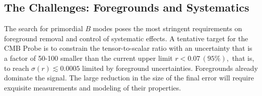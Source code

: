 

\subsection{The Challenges: Foregrounds and Systematics}
\label{sec:foregrounds_systematics}

\vspace{-0.05in}

The search for primordial $B$ modes poses the most stringent requirements on foreground removal 
and control of systematic effects. A tentative target for the CMB Probe is to constrain the tensor-to-scalar ratio with an 
uncertainty that is a factor of 50-100 smaller than the current upper limit $r < 0.07\, (95\%),$ that is, to reach 
$\sigma(r)\lesssim0.0005$ 
limited by foreground uncertainties. 
Foregrounds already dominate the signal. The large reduction in the size of 
the final error will require exquisite measurements and modeling of their properties. 


